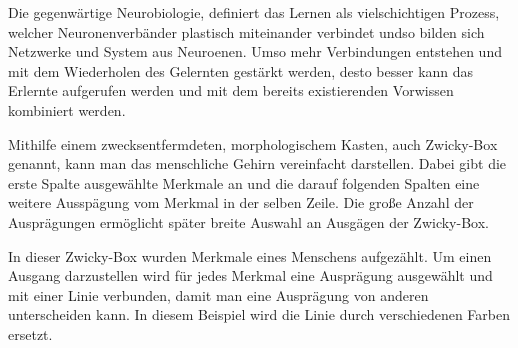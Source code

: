 Die gegenwärtige Neurobiologie, definiert das Lernen als vielschichtigen Prozess, welcher Neuronenverbänder plastisch miteinander verbindet undso bilden sich Netzwerke und System aus Neuroenen. Umso mehr Verbindungen entstehen und mit dem Wiederholen des Gelernten gestärkt werden, desto besser kann das Erlernte aufgerufen werden und mit dem bereits existierenden Vorwissen kombiniert werden.

Mithilfe einem zwecksentfermdeten, morphologischem Kasten, auch Zwicky-Box genannt, kann man das menschliche Gehirn vereinfacht darstellen. Dabei gibt die erste Spalte ausgewählte Merkmale an und die darauf folgenden Spalten eine  weitere Ausspägung vom Merkmal in der selben Zeile. Die große Anzahl der Ausprägungen ermöglicht später breite Auswahl an Ausgägen der Zwicky-Box. 

\begin{table}[ht]
    \centering
    \caption{Beispiel einer Zwicky-Boy}
\end{table}

In dieser Zwicky-Box wurden Merkmale eines Menschens aufgezählt. Um einen Ausgang darzustellen wird für jedes Merkmal eine Ausprägung ausgewählt und mit einer Linie verbunden, damit man eine Ausprägung von anderen unterscheiden kann. In diesem Beispiel wird die Linie durch verschiedenen Farben ersetzt.

\begin{table}[ht]
    \centering
    \caption{Beispiel einer Ausprägung}
    \label{fig:zwicky-box}
\end{table}

